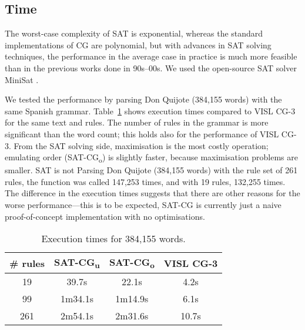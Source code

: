 \documentclass[11pt]{article}
\begin{document}

\subsection{Time}

The worst-case complexity of SAT is exponential, whereas the standard
implementations of CG are polynomial, but with advances in SAT solving
techniques, the performance in the average case in practice is much more feasible than in the previous works done in 90s--00s.
We used the open-source SAT solver MiniSat \cite{een04sat}.

We tested the performance by parsing Don Quijote (384,155 words) with
the same Spanish grammar. Table~\ref{table:time} shows execution times compared to VISL
CG-3 for the same text and rules. 
The number of rules in the grammar is more significant than the word
count; this holds also for the performance of VISL CG-3.
From the SAT solving side, maximisation is the most costly operation; 
emulating order (SAT-CG\textsubscript{o}) is slightly faster, because maximisation problems are smaller.
SAT is not Parsing Don Quijote (384,155 words) with the rule set of 261 rules,
the function was called 147,253 times, and with 19 rules, 132,255 times.
The difference in the execution times suggests that there are other
reasons for the worse performance---this is to be expected,
SAT-CG is currently just a naive proof-of-concept implementation with no optimisations.

\begin{table}
  \centering
  \begin{tabular}{|c|c|c|c|}
     \hline
     \textbf{\# rules} &  \textbf{SAT-CG\textsubscript{u}} & \textbf{SAT-CG\textsubscript{o}} & \textbf{VISL CG-3} \\ \hline
      19   & 39.7s &  22.1s   & 4.2s\\ %
      99   & 1m34.1s & 1m14.9s & 6.1s \\ %
      261  & 2m54.1s & 2m31.6s & 10.7s \\ \hline
  \end{tabular}
  \caption{Execution times for 384,155 words.}
  \label{table:time}
\end{table}
\end{document}
